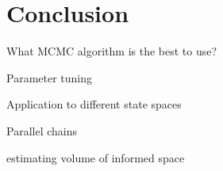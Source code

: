 \documentclass[letterpaper, 10 pt, conference]{ieeeconf}  %
\begin{document}
\section{Conclusion}

What MCMC algorithm is the best to use?

Parameter tuning

Application to different state spaces

Parallel chains

estimating volume of informed space







%
\end{document}
